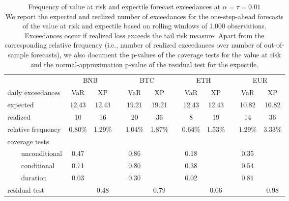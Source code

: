 \begin{table}[!ht]
\vspace*{1em}\centering\caption{Frequency of value at risk and expectile forecast exceedances at $\alpha=\tau=0.01$\\ {\footnotesize We report the expected and realized number of exceedances for the one-step-ahead forecasts of the value at risk and expectile based on rolling windows of 1,000 observations. Exceedances occur if realized loss exceeds the tail risk measure. Apart from the corresponding relative frequency (i.e., number of realized exceedances over number of out-of-sample forecasts), we also document the p-values of the coverage tests for the value at risk and the normal-approximation p-value of the residual test for the expectile.}}
\label{tab:app_backtest}
\begin{tabular}{lccrccrccrcc}
\toprule
 & \multicolumn{2}{c}{BNB} && \multicolumn{2}{c}{BTC} && \multicolumn{2}{c}{ETH} && \multicolumn{2}{c}{EUR}\\
\cline{2-3}\cline{5-6}\cline{8-9}\cline{11-12}
daily exceedances & VaR & XP && VaR & XP && VaR & XP && VaR & XP\\
\midrule
expected & 12.43 & 12.43 &  & 19.21 & 19.21 &  & 12.43 & 12.43 &  & 10.82 & 10.82 \\
realized & 10 & 16 &  & 20 & 36 &  & 8 & 19 &  & 14 & 36 \\
relative frequency & 0.80\% & 1.29\% &  & 1.04\% & 1.87\% &  & 0.64\% & 1.53\% &  & 1.29\% & 3.33\% \\
coverage tests\\
~~~~unconditional & 0.47 &  &  & 0.86 &  &  & 0.18 &  &  & 0.35 &  \\
~~~~conditional & 0.71 &  &  & 0.80 &  &  & 0.38 &  &  & 0.54 &  \\
~~~~duration & 0.03 &  &  & 0.30 &  &  & 0.02 &  &  & 0.81 &  \\
residual test &  & 0.48 &  &  & 0.79 &  &  & 0.06 &  &  & 0.98 \\
\bottomrule
\end{tabular}\end{table}
